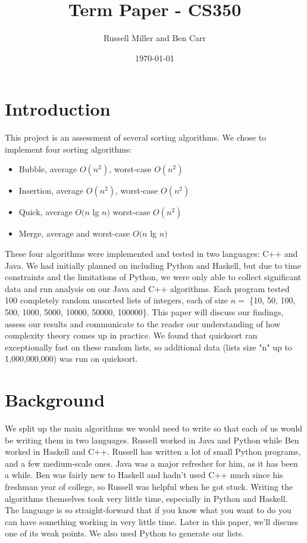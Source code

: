 \documentclass[12pt]{amsart}
\title{Term Paper - CS350}
\author{Russell Miller and Ben Carr}
\date{\today} %
\begin{document}
\maketitle

\section*{Introduction}

This project is an assessment of several sorting algorithms. We chose to implement four sorting algorithms: \\
\begin{itemize}
\item Bubble, average  $O(n^2)$, worst-case $O(n^2)$\\
\item Insertion, average $O(n^2)$, worst-case $O(n^2)$\\
\item Quick, average $O(n$ lg $n)$ worst-case $O(n^2)$\\
\item Merge, average and worst-case $O(n$ lg $n)$\\
\end{itemize}
These four algorithms were implemented and tested in two languages: C++ and Java. We had initially planned on including Python and Haskell, but due to time constraints and the limitations of Python, we were only able to collect significant data and run analysis on our Java and C++ algorithms. Each program tested 100 completely random unsorted lists of integers, each of size $n = $ \{10, 50, 100, 500, 1000, 5000, 10000, 50000, 100000\}. This paper will discuss our findings, assess our results and communicate to the reader our understanding of how complexity theory comes up in practice. We found that quicksort ran exceptionally fast on these random lists, so additional data (lists size "n" up to 1,000,000,000) was run on quicksort.\\
\section*{Background}

We split up the main algorithms we would need to write so that each of us would be
writing them in two languages. Russell worked in Java and Python while Ben worked in Haskell and C++. Russell has
written a lot of small Python programs, and a few medium-scale ones. Java was a
major refresher for him, as it has been a while. Ben was fairly new to Haskell and hadn't used C++ much since his freshman year of college, so Russell was helpful when he got stuck. Writing the algorithms themselves took very little time, especially in Python and Haskell. The language is so straight-forward that if you know what you want to do you can have something working in very little time. Later 
in this paper, we'll discuss one of its weak points. We also used Python to 
generate our lists. 
\end{document}
